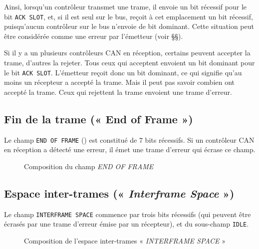 Ainsi, lorsqu'un contrôleur transmet une trame, il envoie un bit récessif pour le bit \texttt{ACK SLOT}, et, si il est seul sur le bus, reçoit à cet emplacement un bit récessif, puisqu'aucun contrôleur sur le bus n'envoie de bit dominant. Cette situation peut être considérée comme une erreur par l'émetteur (voir §§).

Si il y a un plusieurs contrôleurs CAN en réception, certains peuvent accepter la trame, d'autres la rejeter. Tous ceux qui acceptent envoient un bit dominant pour le bit \texttt{ACK SLOT}. L'émetteur reçoit donc un bit dominant, ce qui signifie qu'au moins un récepteur a accepté la trame. Mais il peut pas savoir combien ont accepté la trame. Ceux qui rejettent la trame envoient une trame d'erreur.




\subsection{Fin de la trame (« End of Frame »)}

Le champ \texttt{END OF FRAME} () est constitué de $7$ bits récessifs. Si un contrôleur CAN en réception a détecté une erreur, il émet une trame d'erreur qui écrase ce champ.


\begin{figure}[h]
  \centering
  \caption{Composition du champ \emph{END OF FRAME}}
\end{figure}


\subsection{Espace inter-trames (« \emph{Interframe Space} »)}

Le champ \texttt{INTERFRAME SPACE} commence par trois bits récessifs (qui peuvent être écrasés par une trame d'erreur émise par un récepteur), et du sous-champ \texttt{IDLE}.

\begin{figure}[h]
  \centering
  \caption{Composition de l'espace inter-trames « \emph{INTERFRAME SPACE} »}
\end{figure}

